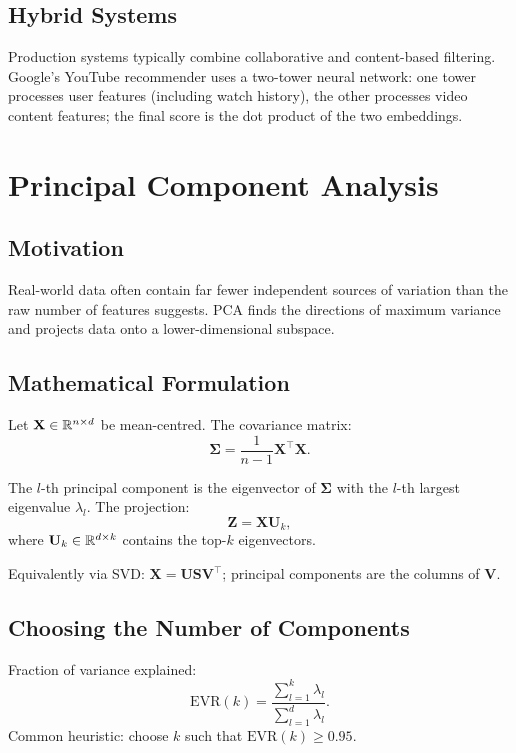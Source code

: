 \subsection{Hybrid Systems}

Production systems typically combine collaborative and content-based filtering.
Google's YouTube recommender uses a two-tower neural network: one tower
processes user features (including watch history), the other processes video
content features; the final score is the dot product of the two embeddings.

\section{Principal Component Analysis}
\label{sec:pca}

\subsection{Motivation}

Real-world data often contain far fewer independent sources of variation than
the raw number of features suggests. PCA finds the directions of maximum
variance and projects data onto a lower-dimensional subspace.

\subsection{Mathematical Formulation}

Let $\mathbf{X}\in\mathbb{R}^{n\times d}$ be mean-centred. The covariance matrix:
\[\boldsymbol{\Sigma}=\frac{1}{n-1}\mathbf{X}^{\top}\mathbf{X}.\]

The $l$-th principal component is the eigenvector of $\boldsymbol{\Sigma}$
with the $l$-th largest eigenvalue $\lambda_l$. The projection:
\[\mathbf{Z}=\mathbf{X}\mathbf{U}_k,\]
where $\mathbf{U}_k\in\mathbb{R}^{d\times k}$ contains the top-$k$ eigenvectors.

Equivalently via SVD: $\mathbf{X}=\mathbf{U}\mathbf{S}\mathbf{V}^{\top}$;
principal components are the columns of $\mathbf{V}$.

\subsection{Choosing the Number of Components}

Fraction of variance explained:
\[\mathrm{EVR}(k)=\frac{\sum_{l=1}^k\lambda_l}{\sum_{l=1}^d\lambda_l}.\]
Common heuristic: choose $k$ such that $\mathrm{EVR}(k)\ge 0.95$.

